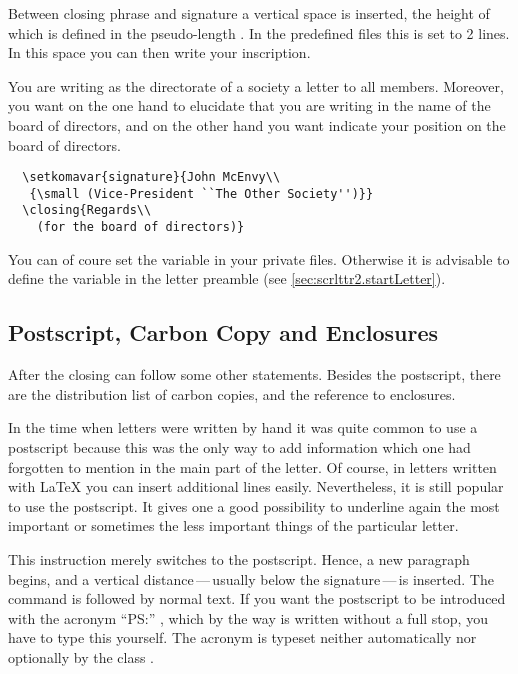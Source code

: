 Between closing phrase and signature a vertical space is inserted, the
height of which is defined in the pseudo-length
. In the predefined  files this is
set to 2 lines.  In this space you can then write your inscription.
\begin{Example}
  You are writing as the directorate of a society a letter to all
  members.  Moreover, you want on the one hand to elucidate that you
  are writing in the name of the board of directors, and on the other
  hand you want indicate your position on the board of directors.
\begin{lstlisting}
  \setkomavar{signature}{John McEnvy\\
   {\small (Vice-President ``The Other Society'')}}
  \closing{Regards\\
    (for the board of directors)}
\end{lstlisting}
You can of coure set the variable  in your private
 files.  Otherwise it is advisable to define the variable in
the letter preamble (see \autoref{sec:scrlttr2.startLetter}).
\end{Example}
%
%
%
%

\subsection{Postscript, Carbon Copy and Enclosures}
\label{sec:scrlttr2.afterClosing}

After the closing can follow some other statements.  Besides the
postscript, there are the distribution list of carbon copies, and the
reference to enclosures.
 
\begin{Explain}%
\begin{Declaration}
\end{Declaration}%
%
In the time when letters were written by hand it was quite common to
use a postscript because this was the only way to add information
which one had forgotten to mention in the main part of the letter. Of
course, in letters written with {\LaTeX} you can insert additional
lines easily. Nevertheless, it is still popular to use the
postscript. It gives one a good possibility to underline again the
most important or sometimes the less important things of the
particular letter.
%
\end{Explain}
This instruction merely switches to the postscript.  Hence, a new
paragraph begins, and a vertical distance\,---\,usually below the
signature\,---\,is inserted.  The command  is followed by
normal text. If you want the postscript to be introduced with the
acronym ``PS:'' , which by the way is written without a full stop, you
have to type this yourself. The acronym is typeset neither
automatically nor optionally by the class .
%


